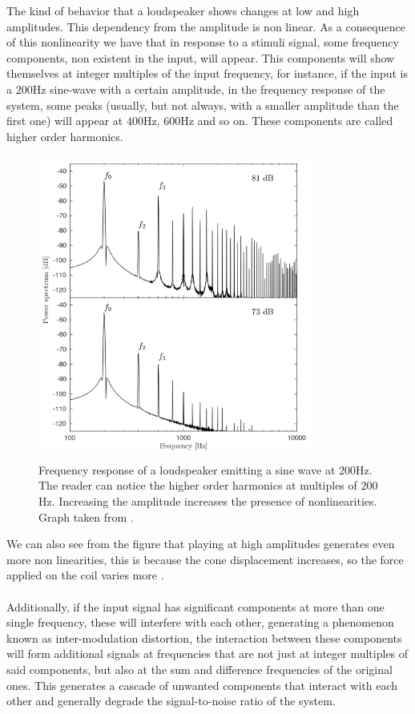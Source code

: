 The kind of behavior that a loudspeaker shows changes at low and high amplitudes. This dependency from the amplitude is non linear. As a consequence of this nonlinearity we have that in response to a stimuli signal, some frequency components, non existent in the input, will appear. This components will show themselves at integer multiples of the input frequency, for instance, if the input is a $200$Hz sine-wave with a certain amplitude, in the frequency response of the system, some peaks (usually, but not always, with a smaller amplitude than the first one) will appear at $400$Hz, $600$Hz and so on. These components are called higher order harmonics.

\begin{figure}[th]
\centering
\includegraphics[width=9cm,height=10cm,keepaspectratio]{Figures/nonlinearities}
\decoRule
\caption[Frequency response of a loudspeaker emitting a sine wave at 200Hz]{Frequency response of a loudspeaker emitting a sine wave at 200Hz. The reader can notice the higher order harmonics at multiples of $200$Hz. Increasing the amplitude increases the presence of nonlinearities. Graph taken from \parencite{ma_personal_2016}.}
\label{fig:nonlinearities}
\end{figure}
We can also see from the figure that playing at high amplitudes generates even more non linearities, this is because the cone displacement increases, so the force applied on the coil varies more \parencite{ma_personal_2016}.
\\
\\
Additionally, if the input signal has significant components at more than one single frequency, these will interfere with each other, generating a phenomenon known as inter-modulation distortion, the interaction between these components will form additional signals at frequencies that are not just at integer multiples of said components, but also at the sum and difference frequencies of the original ones. This generates a cascade of unwanted components that interact with each other and generally degrade the signal-to-noise ratio of the system.
